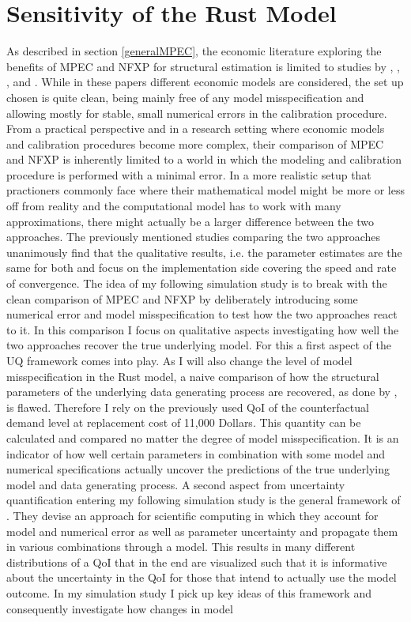 \section{Sensitivity of the Rust Model} \label{sensitivity}
\thispagestyle{plain} %

As described in section \ref{generalMPEC}, the economic literature exploring the benefits of MPEC and NFXP for structural estimation is limited to studies by \cite{Su.Judd.2012}, \cite{Dube.Fox.Su.2012}, \cite{Jorgensen.2013}, \cite{Iskhakov.2016} and \cite{Dong.Hsieh.Zhang.2017}. While in these papers different economic models are considered, the set up chosen is quite clean, being mainly free of any model misspecification and allowing mostly for stable, small numerical errors in the calibration procedure. From a practical perspective and in a research setting where economic models and calibration procedures become more complex, their comparison of MPEC and NFXP is inherently limited to a world in which the modeling and calibration procedure is performed with a minimal error. In a more realistic setup that practioners commonly face where their mathematical model might be more or less off from reality and the computational model has to work with many approximations, there might actually be a larger difference between the two approaches. The previously mentioned studies comparing the two approaches unanimously find that the qualitative results, i.e. the parameter estimates are the same for both and focus on the implementation side covering the speed and rate of convergence. The idea of my following simulation study is to break with the clean comparison of MPEC and NFXP by deliberately introducing some numerical error and model misspecification to test how the two approaches react to it. In this comparison I focus on qualitative aspects investigating how well the two approaches recover the true underlying model. For this a first aspect of the UQ framework comes into play. As I will also change the level of model misspecification in the Rust model, a naive comparison of how the structural parameters of the underlying data generating process are recovered, as done by \cite{Su.Judd.2012}, is flawed. Therefore I rely on the previously used QoI of the counterfactual demand level at replacement cost of 11,000 Dollars. This quantity can be calculated and compared no matter the degree of model misspecification. It is an indicator of how well certain parameters in combination with some model and numerical specifications actually uncover the predictions of the true underlying model and data generating process. A second aspect from uncertainty quantification entering my following simulation study is the general framework of \cite{Oberkampf.2010}. They devise an approach for scientific computing in which they account for model and numerical error as well as parameter uncertainty and propagate them in various combinations through a model. This results in many different distributions of a QoI that in the end are visualized such that it is informative about the uncertainty in the QoI for those that intend to actually use the model outcome. In my simulation study I pick up key ideas of this framework and consequently investigate how changes in model 